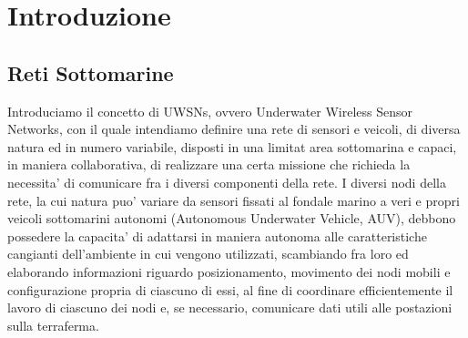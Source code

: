 \chapter{Introduzione}

\section{Reti Sottomarine}
Introduciamo il concetto di UWSNs, ovvero Underwater Wireless  Sensor Networks, con il quale intendiamo definire una rete di sensori e veicoli, di diversa natura ed in numero variabile, disposti in una limitat area sottomarina e capaci, in maniera collaborativa, di realizzare una certa missione che richieda la necessita' di comunicare fra i diversi componenti della rete.\newline
I diversi nodi della rete, la cui natura puo' variare da sensori fissati al fondale marino a veri e propri veicoli sottomarini autonomi (Autonomous Underwater Vehicle, AUV), debbono possedere la capacita' di adattarsi in maniera autonoma alle caratteristiche cangianti dell'ambiente in cui vengono utilizzati, scambiando fra loro ed elaborando informazioni riguardo posizionamento, movimento dei nodi mobili e configurazione propria di ciascuno di essi, al fine di coordinare efficientemente il lavoro di ciascuno dei nodi e, se necessario, comunicare dati utili alle postazioni sulla terraferma.

